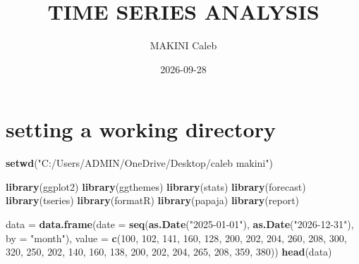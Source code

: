 \documentclass[
]{article}
\title{TIME SERIES ANALYSIS}
\author{MAKINI Caleb}
\date{2026-09-28}
\newenvironment{Shaded}{\begin{snugshade}}{\end{snugshade}}
\newcommand{\AttributeTok}[1]{\textcolor[rgb]{0.13,0.29,0.53}{#1}}
\newcommand{\DecValTok}[1]{\textcolor[rgb]{0.00,0.00,0.81}{#1}}
\newcommand{\FunctionTok}[1]{\textcolor[rgb]{0.13,0.29,0.53}{\textbf{#1}}}
\newcommand{\NormalTok}[1]{#1}
\newcommand{\OtherTok}[1]{\textcolor[rgb]{0.56,0.35,0.01}{#1}}
\newcommand{\StringTok}[1]{\textcolor[rgb]{0.31,0.60,0.02}{#1}}
\begin{document}
\maketitle

\section{setting a working directory}\label{setting-a-working-directory}

\begin{Shaded}
\begin{Highlighting}[]
\FunctionTok{setwd}\NormalTok{(}\StringTok{"C:/Users/ADMIN/OneDrive/Desktop/caleb makini"}\NormalTok{)}
\end{Highlighting}
\end{Shaded}

\begin{Shaded}
\begin{Highlighting}[]
\FunctionTok{library}\NormalTok{(ggplot2)}
\FunctionTok{library}\NormalTok{(ggthemes)}
\FunctionTok{library}\NormalTok{(stats)}
\FunctionTok{library}\NormalTok{(forecast)}
\FunctionTok{library}\NormalTok{(tseries)}
\FunctionTok{library}\NormalTok{(formatR)}
\FunctionTok{library}\NormalTok{(papaja)}
\FunctionTok{library}\NormalTok{(report)}
\end{Highlighting}
\end{Shaded}

\begin{Shaded}
\begin{Highlighting}[]
\NormalTok{data }\OtherTok{=} \FunctionTok{data.frame}\NormalTok{(}\AttributeTok{date =} \FunctionTok{seq}\NormalTok{(}\FunctionTok{as.Date}\NormalTok{(}\StringTok{"2025{-}01{-}01"}\NormalTok{), }\FunctionTok{as.Date}\NormalTok{(}\StringTok{"2026{-}12{-}31"}\NormalTok{), }\AttributeTok{by =} \StringTok{"month"}\NormalTok{),}
    \AttributeTok{value =} \FunctionTok{c}\NormalTok{(}\DecValTok{100}\NormalTok{, }\DecValTok{102}\NormalTok{, }\DecValTok{141}\NormalTok{, }\DecValTok{160}\NormalTok{, }\DecValTok{128}\NormalTok{, }\DecValTok{200}\NormalTok{, }\DecValTok{202}\NormalTok{, }\DecValTok{204}\NormalTok{, }\DecValTok{260}\NormalTok{, }\DecValTok{208}\NormalTok{, }\DecValTok{300}\NormalTok{, }\DecValTok{320}\NormalTok{, }\DecValTok{250}\NormalTok{, }\DecValTok{202}\NormalTok{,}
        \DecValTok{140}\NormalTok{, }\DecValTok{160}\NormalTok{, }\DecValTok{138}\NormalTok{, }\DecValTok{200}\NormalTok{, }\DecValTok{202}\NormalTok{, }\DecValTok{204}\NormalTok{, }\DecValTok{265}\NormalTok{, }\DecValTok{208}\NormalTok{, }\DecValTok{359}\NormalTok{, }\DecValTok{380}\NormalTok{))}
\FunctionTok{head}\NormalTok{(data)}
\end{Highlighting}
\end{Shaded}
\end{document}
